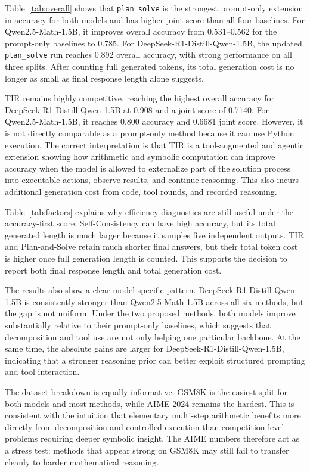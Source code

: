 \documentclass[conference]{IEEEtran}
\newcommand{\qwen}{Qwen2.5-Math-1.5B}
\newcommand{\deepseek}{DeepSeek-R1-Distill-Qwen-1.5B}
\begin{document}
Table~\ref{tab:overall} shows that \texttt{plan\_solve} is the strongest prompt-only extension in accuracy for both models and has higher joint score than all four baselines. For \qwen{}, it improves overall accuracy from 0.531--0.562 for the prompt-only baselines to 0.785. For \deepseek{}, the updated \texttt{plan\_solve} run reaches 0.892 overall accuracy, with strong performance on all three splits. After counting full generated tokens, its total generation cost is no longer as small as final response length alone suggests.

TIR remains highly competitive, reaching the highest overall accuracy for \deepseek{} at 0.908 and a joint score of 0.7140. For \qwen{}, it reaches 0.800 accuracy and 0.6681 joint score. However, it is not directly comparable as a prompt-only method because it can use Python execution. The correct interpretation is that TIR is a tool-augmented and agentic extension showing how arithmetic and symbolic computation can improve accuracy when the model is allowed to externalize part of the solution process into executable actions, observe results, and continue reasoning. This also incurs additional generation cost from code, tool rounds, and recorded reasoning.

Table~\ref{tab:factors} explains why efficiency diagnostics are still useful under the accuracy-first score. Self-Consistency can have high accuracy, but its total generated length is much larger because it samples five independent outputs. TIR and Plan-and-Solve retain much shorter final answers, but their total token cost is higher once full generation length is counted. This supports the decision to report both final response length and total generation cost.

The results also show a clear model-specific pattern. \deepseek{} is consistently stronger than \qwen{} across all six methods, but the gap is not uniform. Under the two proposed methods, both models improve substantially relative to their prompt-only baselines, which suggests that decomposition and tool use are not only helping one particular backbone. At the same time, the absolute gains are larger for \deepseek{}, indicating that a stronger reasoning prior can better exploit structured prompting and tool interaction.

The dataset breakdown is equally informative. GSM8K is the easiest split for both models and most methods, while AIME 2024 remains the hardest. This is consistent with the intuition that elementary multi-step arithmetic benefits more directly from decomposition and controlled execution than competition-level problems requiring deeper symbolic insight. The AIME numbers therefore act as a stress test: methods that appear strong on GSM8K may still fail to transfer cleanly to harder mathematical reasoning.
\end{document}
